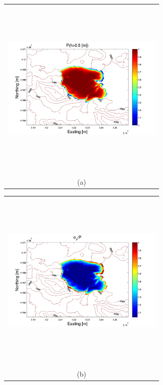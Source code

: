 \documentclass[12pt]{article}
\newcommand{\Pic}[2][0.85]{\begin{center}\texttt{[image: \#2]}
 \end{center} }
\begin{document}
\begin{figure}[H]
    \begin{minipage}[b]{0.6\textwidth}
        \begin{tabular}{c}
       \includegraphics[width=8cm,height=9cm,keepaspectratio]{figs_pdf/Mammoth_0_P.pdf}\\
        (a)
        \end{tabular}
    \end{minipage}
    \begin{minipage}{0.6\textwidth}
        \begin{tabular}{c}
	\includegraphics[width=8cm,height=9cm,keepaspectratio]{figs_pdf/Mammoth_0_sigma.pdf}\\
        (b)

\end{tabular}
\end{minipage}
\end{figure}
\end{document}
